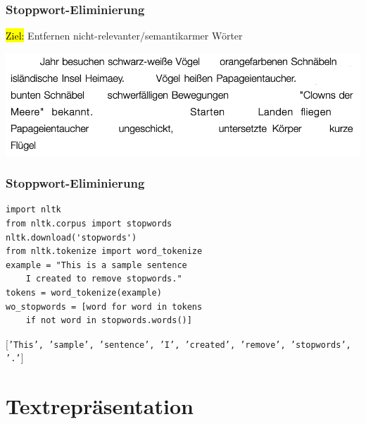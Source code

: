 \begin{frame}
    \frametitle{Stoppwort-Eliminierung}

    \hl{Ziel:} Entfernen nicht-relevanter/semantikarmer Wörter

    \centering\includegraphics[width=\textwidth]{fig8/stopwords_example2}

\end{frame}
     

\begin{frame}[fragile]
    \frametitle{Stoppwort-Eliminierung}

\begin{verbatim}
import nltk
from nltk.corpus import stopwords
nltk.download('stopwords')
from nltk.tokenize import word_tokenize
example = "This is a sample sentence 
    I created to remove stopwords."
tokens = word_tokenize(example)
wo_stopwords = [word for word in tokens 
    if not word in stopwords.words()]
\end{verbatim}

    \texttt{$[$'This', 'sample', 'sentence', 'I', 'created', 'remove', 'stopwords', '.'$]$}
    
\end{frame}


\section{Textrepräsentation}


